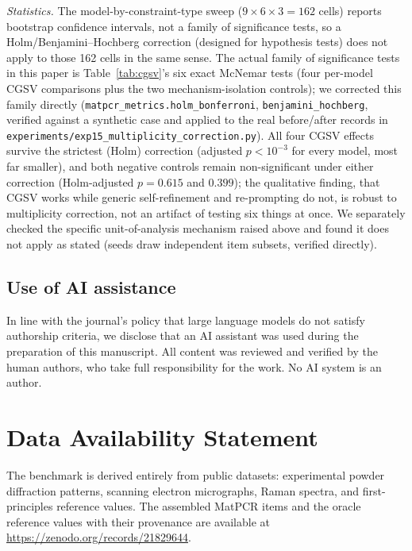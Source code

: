 \documentclass[pdflatex,sn-nature]{sn-jnl}
\begin{document}
\noindent\emph{Statistics.} The model-by-constraint-type sweep ($9\times6\times3=162$ cells)
reports bootstrap confidence intervals, not a family of significance tests, so a
Holm/Benjamini--Hochberg correction (designed for hypothesis tests) does not apply to those
162 cells in the same sense. The actual family of significance tests in this paper is
Table~\ref{tab:cgsv}'s six exact McNemar tests (four per-model CGSV comparisons plus the two
mechanism-isolation controls); we corrected this family directly
(\texttt{matpcr\_metrics.holm\_bonferroni}, \texttt{benjamini\_hochberg}, verified against a
synthetic case and applied to the real before/after records in
\texttt{experiments/exp15\_multiplicity\_correction.py}). All four CGSV effects survive the
strictest (Holm) correction (adjusted $p<10^{-3}$ for every model, most far smaller), and
both negative controls remain non-significant under either correction (Holm-adjusted
$p=0.615$ and $0.399$); the qualitative finding, that CGSV works while generic
self-refinement and re-prompting do not, is robust to multiplicity correction, not an
artifact of testing six things at once. We separately checked the specific unit-of-analysis
mechanism raised above and found it does not apply as stated (seeds draw independent item
subsets, verified directly).

\subsection*{Use of AI assistance}
In line with the journal's policy that large language models do not satisfy
authorship criteria, we disclose that an AI assistant was used during the preparation of
this manuscript. All content was reviewed and verified by the human authors, who take
full responsibility for the work. No AI system is an author.

\section*{Data Availability Statement}
The benchmark is derived entirely from public datasets: experimental powder diffraction
patterns,\cite{opxrd2025} scanning electron micrographs,\cite{aversa2018nffa} Raman
spectra,\cite{lafuente2015rruff} and first-principles reference values.\cite{matproj2013} The assembled MatPCR items and the oracle
reference values with their provenance are available at \url{https://zenodo.org/records/21829644}.
\end{document}
